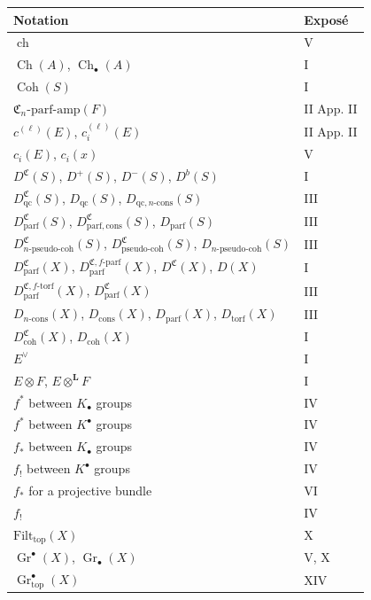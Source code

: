 \documentclass[11pt]{article}
\theoremstyle{plain}
\theoremstyle{definition}
\theoremstyle{remark}
\DeclareMathOperator{\Gr}{Gr}
\providecommand{\ch}{\operatorname{ch}}
\providecommand{\Ch}{\operatorname{Ch}}
\providecommand{\LL}{\mathbf L}
\providecommand{\topf}{\mathrm{top}}
\begin{document}
\begin{longtable}{p{7.5cm}l}
\toprule
\textbf{Notation} & \textbf{Exposé}\\
\midrule
\endhead
$\ch$ & V\\
$\Ch(A)$, $\Ch_\bullet(A)$ & I\\
$\operatorname{Coh}(S)$ & I\\
$\mathfrak C_n$-$\mathrm{parf\text{-}amp}(F)$ & II App. II\\
$c^{(\ell)}(E)$, $c_i^{(\ell)}(E)$ & II App. II\\
$c_i(E)$, $c_i(x)$ & V\\
$D^{\mathfrak C}(S)$, $D^{+}(S)$, $D^{-}(S)$, $D^{b}(S)$ & I\\
$D^{\mathfrak C}_{\mathrm{qc}}(S)$, $D_{\mathrm{qc}}(S)$, $D_{\mathrm{qc},n\text{-}\mathrm{cons}}(S)$ & III\\
$D^{\mathfrak C}_{\mathrm{parf}}(S)$, $D^{\mathfrak C}_{\mathrm{parf,cons}}(S)$, $D_{\mathrm{parf}}(S)$ & III\\
$D^{\mathfrak C}_{n\text{-}\mathrm{pseudo\text{-}coh}}(S)$, $D^{\mathfrak C}_{\mathrm{pseudo\text{-}coh}}(S)$, $D_{n\text{-}\mathrm{pseudo\text{-}coh}}(S)$ & III\\
$D_{\mathrm{parf}}^{\mathfrak C}(X)$, $D_{\mathrm{parf}}^{\mathfrak C,f\text{-}\mathrm{parf}}(X)$, $D^{\mathfrak C}(X)$, $D(X)$ & I\\
$D_{\mathrm{parf}}^{\mathfrak C,f\text{-}\mathrm{torf}}(X)$, $D_{\mathrm{parf}}^{\mathfrak C}(X)$ & III\\
$D_{n\text{-}\mathrm{cons}}(X)$, $D_{\mathrm{cons}}(X)$, $D_{\mathrm{parf}}(X)$, $D_{\mathrm{torf}}(X)$ & III\\
$D_{\mathrm{coh}}^{\mathfrak C}(X)$, $D_{\mathrm{coh}}(X)$ & I\\
$E^\vee$ & I\\
$E\otimes F$, $E\otimes^{\LL}F$ & I\\
$f^*$ between $K_\bullet$ groups & IV\\
$f^*$ between $K^\bullet$ groups & IV\\
$f_*$ between $K_\bullet$ groups & IV\\
$f_!$ between $K^\bullet$ groups & IV\\
$f_*$ for a projective bundle & VI\\
$f_!$ & IV\\
$\mathrm{Filt}_{\topf}(X)$ & X\\
$\Gr^\bullet(X)$, $\Gr_\bullet(X)$ & V, X\\
$\Gr^\bullet_{\topf}(X)$ & XIV\\

\end{longtable}
\end{document}
